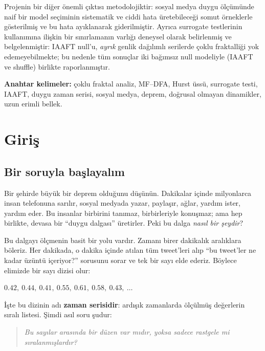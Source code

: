 \documentclass[11pt,a4paper]{article}
\begin{document}
Projenin bir diğer önemli çıktısı metodolojiktir: sosyal medya duygu ölçümünde
naif bir model seçiminin sistematik ve ciddi hata üretebileceği somut
örneklerle gösterilmiş ve bu hata ayıklanarak giderilmiştir. Ayrıca
surrogate testlerinin kullanımına ilişkin bir sınırlamanın varlığı
deneysel olarak belirlenmiş ve belgelenmiştir: IAAFT null'u, \emph{ayrık} genlik
dağılımlı serilerde çoklu fraktalliği yok edemeyebilmekte; bu nedenle tüm
sonuçlar iki bağımsız null modeliyle (IAAFT ve shuffle) birlikte raporlanmıştır.

\textbf{Anahtar kelimeler:} çoklu fraktal analiz, MF--DFA, Hurst üssü,
surrogate testi, IAAFT, duygu zaman serisi, sosyal medya, deprem,
doğrusal olmayan dinamikler, uzun erimli bellek.

\tableofcontents
\newpage

\section{Giriş}

\subsection{Bir soruyla başlayalım}

Bir şehirde büyük bir deprem olduğunu düşünün. Dakikalar içinde milyonlarca
insan telefonuna sarılır, sosyal medyada yazar, paylaşır, ağlar, yardım ister,
yardım eder. Bu insanlar birbirini tanımaz, birbirleriyle konuşmaz; ama hep
birlikte, devasa bir ``duygu dalgası'' üretirler. Peki bu dalga \emph{nasıl bir
şeydir}?

Bu dalgayı ölçmenin basit bir yolu vardır. Zamanı birer dakikalık aralıklara
böleriz. Her dakikada, o dakika içinde atılan tüm tweet'leri alıp ``bu tweet'ler
ne kadar üzüntü içeriyor?'' sorusunu sorar ve tek bir sayı elde ederiz. Böylece
elimizde bir sayı dizisi olur:

\begin{center}
$0.42,\ 0.44,\ 0.41,\ 0.55,\ 0.61,\ 0.58,\ 0.43,\ \dots$
\end{center}

İşte bu dizinin adı \textbf{zaman serisidir}: ardışık zamanlarda ölçülmüş
değerlerin sıralı listesi. Şimdi asıl soru şudur:

\begin{quote}
\emph{Bu sayılar arasında bir düzen var mıdır, yoksa sadece rastgele mi
sıralanmışlardır?}
\end{quote}
\end{document}
